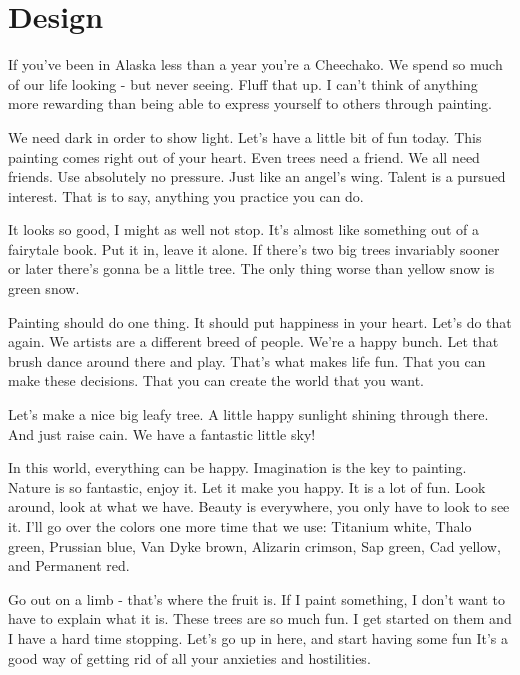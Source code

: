 \section{Design}
If you've been in Alaska less than a year you're a Cheechako. We spend so much of our life looking - but never seeing. Fluff that up. I can't think of anything more rewarding than being able to express yourself to others through painting.

We need dark in order to show light. Let's have a little bit of fun today. This painting comes right out of your heart. Even trees need a friend. We all need friends. Use absolutely no pressure. Just like an angel's wing. Talent is a pursued interest. That is to say, anything you practice you can do.

It looks so good, I might as well not stop. It's almost like something out of a fairytale book. Put it in, leave it alone. If there's two big trees invariably sooner or later there's gonna be a little tree. The only thing worse than yellow snow is green snow.

Painting should do one thing. It should put happiness in your heart. Let's do that again. We artists are a different breed of people. We're a happy bunch. Let that brush dance around there and play. That's what makes life fun. That you can make these decisions. That you can create the world that you want.

Let's make a nice big leafy tree. A little happy sunlight shining through there. And just raise cain. We have a fantastic little sky!

In this world, everything can be happy. Imagination is the key to painting. Nature is so fantastic, enjoy it. Let it make you happy. It is a lot of fun. Look around, look at what we have. Beauty is everywhere, you only have to look to see it. I'll go over the colors one more time that we use: Titanium white, Thalo green, Prussian blue, Van Dyke brown, Alizarin crimson, Sap green, Cad yellow, and Permanent red.

Go out on a limb - that's where the fruit is. If I paint something, I don't want to have to explain what it is. These trees are so much fun. I get started on them and I have a hard time stopping. Let's go up in here, and start having some fun It's a good way of getting rid of all your anxieties and hostilities.

